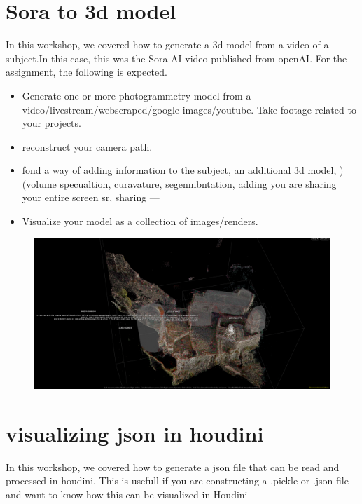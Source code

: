 \documentclass[11pt, a4paper, twoside]{article}
\begin{document}
	\newpage
	\section*{Sora to 3d model}

In this workshop, we covered how to generate a 3d model from a video of
a subject.In this case, this was the Sora AI video published from openAI. For the assignment, the
following is expected.



	\begin{itemize}
		\item Generate one or more photogrammetry model from a video/livestream/webscraped/google images/youtube. Take footage related to your projects.
		\item reconstruct your camera path.
		\item fond a way of adding information to the subject, an additional 3d model, ) (volume specualtion, curavature, segenmbntation, adding you are sharing your entire screen sr, sharing — 	
		\item Visualize your model as a collection of images/renders.
	\end{itemize}


	\begin{figure}[h]
		  \centering
		  \includegraphics[width=\textwidth]{media/sora.png}
	\end{figure}



	\newpage
	\section*{visualizing json in houdini}

In this workshop, we covered how to  generate a json file that can be read and processed in
houdini. This is usefull if you are constructing a .pickle or .json file  and want to know how this can be visualized in Houdini
\end{document}
